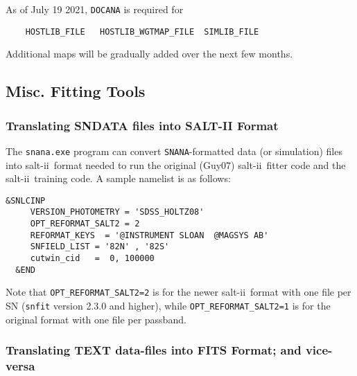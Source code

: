 \documentclass[12pt]{article}
\newcommand{\SALTII}{{\sc salt-ii}}
\newcommand{\snana}{{\tt SNANA}}
\newcommand{\DOCANA}{{\tt DOCANA}}
\begin{document}
\bigskip
\noindent
As of July 19 2021, {\DOCANA} is required for
\vspace{-0.3cm}
\begin{verbatim}
    HOSTLIB_FILE   HOSTLIB_WGTMAP_FILE  SIMLIB_FILE
\end{verbatim}
\vspace{-0.3cm}
Additional maps will be gradually added over the next few months.


  \clearpage
  \subsection{Misc. Fitting Tools}
  \label{subsec:MiscTools_fit}


  \subsubsection{Translating SNDATA files into SALT-II Format}
  \label{sss:lcmerge2salt}

The {\tt snana.exe} program can convert \snana-formatted data 
(or simulation) files into \SALTII\ format needed to run the 
original (Guy07) \SALTII\ fitter code and the \SALTII\ training code.
A sample namelist is as follows:
%
\begin{Verbatim}[frame=single]
  &SNLCINP
     VERSION_PHOTOMETRY = 'SDSS_HOLTZ08'
     OPT_REFORMAT_SALT2 = 2
     REFORMAT_KEYS  = '@INSTRUMENT SLOAN  @MAGSYS AB'
     SNFIELD_LIST = '82N' , '82S' 
     cutwin_cid   =  0, 100000
  &END
\end{Verbatim}
Note that {\tt OPT\_REFORMAT\_SALT2=2} is for the newer
\SALTII\ format with one file per SN 
({\tt snfit} version 2.3.0 and higher),
while {\tt OPT\_REFORMAT\_SALT2=1} is for the original 
format with one file per passband.


  \subsubsection{Translating TEXT data-files into FITS Format; and vice-versa}
  \label{sss:text2fits}
\end{document}
